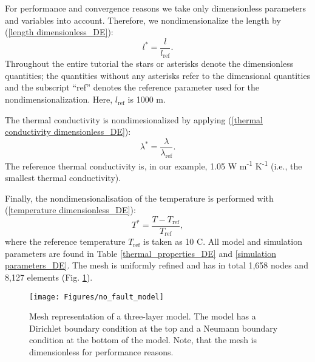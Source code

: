 \documentclass[11pt, a4paper, DIV=14]{scrartcl}
\begin{document}
For performance and convergence reasons we take only dimensionless parameters and variables into account. Therefore, we nondimensionalize the length by (\ref{length dimensionless_DE}):
% 
\begin{equation}
l^* = \frac{l}{l_{\textrm{ref}}}. 
\label{length dimensionless_DE}
\end{equation}
%
Throughout the entire tutorial the stars or asterisks denote the dimensionless quantities; the quantities without any asterisks refer to the dimensional quantities and the subscript ``ref'' denotes the reference parameter used for the nondimensionalization. Here,  $l_{\textrm{ref}}$ is 1000 m.

\noindent The thermal conductivity is nondimesionalized by applying (\ref{thermal conductivity dimensionless_DE}):
%
\begin{equation}
\lambda^* = \frac{\lambda}{\lambda_{\textrm{ref}}}.
\label{thermal conductivity dimensionless_DE}
\end{equation}
%
The reference thermal conductivity is, in our example, 1.05 W m\textsuperscript{-1} K\textsuperscript{-1} (i.e., the smallest thermal conductivity). 

Finally, the nondimensionalisation of the temperature is performed with (\ref{temperature dimensionless_DE}):
%
\begin{equation}
T^*=\frac{T-T_{\textrm{ref}}}{T_{\textrm{ref}}},
\label{temperature dimensionless_DE}
\end{equation}
% 
where the reference temperature $T_{\textrm{ref}}$ is taken as 10 \textdegree C. All model and simulation parameters are found in Table \ref{thermal_properties_DE} and \ref{simulation parameters_DE}. The mesh is uniformly refined and has in total 1,658 nodes and 8,127 elements (Fig. \ref{simulations_DE}).

\begin{figure}
\center
\texttt{[image: Figures/no\_fault\_model]}
\caption{Mesh representation of a three-layer model. The model has a Dirichlet boundary condition at the top and a Neumann boundary condition at the bottom of the model. Note, that the mesh is dimensionless for performance reasons.}
\label{simulations_DE}
\end{figure}
\end{document}
